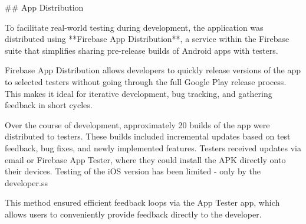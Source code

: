 \documentclass[
  digital,     %
  oneside,     %
  nosansbold,  %
  nocolorbold, %
  lof,         %
  lot,         %
]{fithesis4}
\begin{document}
\begin{markdown}
## App Distribution

To facilitate real-world testing during development, the application was distributed using **Firebase App Distribution**, a service within the Firebase suite that simplifies sharing pre-release builds of Android apps with testers.

Firebase App Distribution allows developers to quickly release versions of the app to selected testers without going through the full Google Play release process. This makes it ideal for iterative development, bug tracking, and gathering feedback in short cycles.

Over the course of development, approximately 20 builds of the app were distributed to testers. These builds included incremental updates based on test feedback, bug fixes, and newly implemented features. Testers received updates via email or Firebase App Tester, where they could install the APK directly onto their devices. Testing of the iOS version has been limited - only by the developer.ss

This method ensured efficient feedback loops via the App Tester app, which allows users to conveniently provide feedback directly to the developer.

\end{markdown}
\shorthandon{-}
\end{document}
